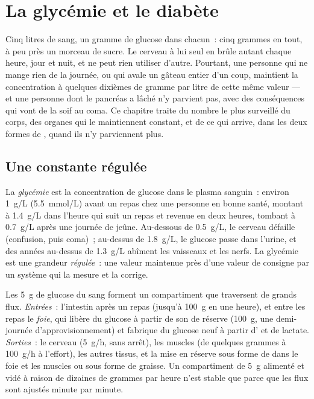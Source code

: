 \chapter{La glycémie et le diabète}\label{ch:g12:glucose-and-diabetes}

Cinq litres de sang, un gramme de glucose dans chacun~: cinq grammes
en tout, à peu près un morceau de sucre. Le cerveau à lui seul en
brûle autant chaque heure, jour et nuit, et ne peut rien utiliser
d'autre. Pourtant, une personne qui ne mange rien de la journée, ou
qui avale un gâteau entier d'un coup, maintient la concentration à
quelques dixièmes de gramme par litre de cette même valeur --- et une
personne dont le pancréas a lâché n'y parvient pas, avec des
conséquences qui vont de la soif au coma. Ce chapitre traite du nombre
le plus surveillé du corps, des organes qui le maintiennent constant,
et de ce qui arrive, dans les deux formes de , quand ils n'y
parviennent plus.

\section{Une constante régulée}

\begin{definition}[Glycémie]\label{def:g12:glucose-and-diabetes:glycaemia}
La \emph{glycémie} est la concentration de glucose
dans le plasma sanguin~: environ \qty{1}{g/L} (\qty{5.5}{mmol/L})
avant un repas chez une personne en bonne santé, montant à
\qty{1.4}{g/L} dans l'heure qui suit un repas et revenue en deux
heures, tombant à \qty{0.7}{g/L} après une journée de jeûne.
Au-dessous de \qty{0.5}{g/L}, le cerveau défaille (confusion, puis
coma)~; au-dessus de \qty{1.8}{g/L}, le glucose passe dans l'urine, et
des années au-dessus de \qty{1.3}{g/L} abîment les vaisseaux et les
nerfs. La glycémie est une grandeur \emph{régulée}~: une valeur
maintenue près d'une valeur de consigne par un système qui la mesure
et la corrige.
\end{definition}

\begin{proposition}\label{prop:g12:glucose-and-diabetes:pool}
Les \qty{5}{g} de glucose du sang forment un compartiment que
traversent de grands flux. \emph{Entrées}~: l'intestin après un repas
(jusqu'à \qty{100}{g} en une heure), et entre les repas le
\emph{foie}, qui libère du glucose à partir de son \emph{} de
réserve (\qty{100}{g}, une demi-journée d'approvisionnement) et
fabrique du glucose neuf à partir d' et de lactate.
\emph{Sorties}~: le cerveau (\qty{5}{g/h}, sans arrêt), les muscles
(de quelques grammes à \qty{100}{g/h} à l'effort), les autres tissus,
et la mise en réserve sous forme de  dans le foie et les
muscles ou sous forme de graisse. Un compartiment de \qty{5}{g}
alimenté et vidé à raison de dizaines de grammes par heure n'est
stable que parce que les flux sont ajustés minute par minute.
\end{proposition}
\admitted

